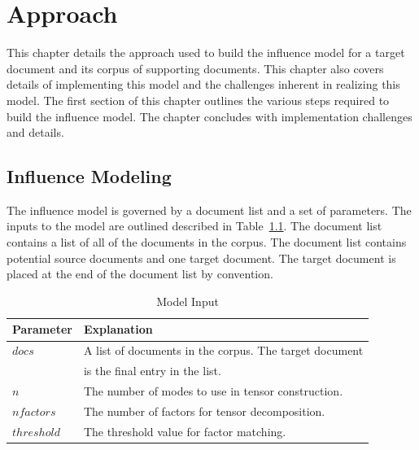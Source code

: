 \documentclass[../ut-dissertation.tex]{subfiles}
\begin{document}


\chapter{Approach}
This chapter details the approach used to build the influence model
for a target document and its corpus of supporting documents.  This
chapter also covers details of implementing this model and the
challenges inherent in realizing this model.  The first section of
this chapter outlines the various steps required to build the
influence model.  The chapter concludes with implementation challenges
and details.


\section{Influence Modeling}
The influence model is governed by a document list and a set of
parameters.  The inputs to the model are outlined described in
Table~\ref{table:modelInput}.  The document list contains a list of all
of the documents in the corpus.  The document list contains potential
source documents and one target document.  The target document is
placed at the end of the document list by convention.
\begin{table}[p]
  \centering
  \caption{Model Input}
  \label{table:modelInput}
  \begin{tabular}{ll}
    \hline
    Parameter & Explanation\\
    \hline
    $docs$ & A list of documents in the corpus.  The target document\\
           & is the final entry in the list. \\
    $n$ & The number of modes to use in tensor construction. \\
    $nfactors$ & The number of factors for tensor decomposition.\\
    $threshold$ & The threshold value for factor matching.\\
    \hline
  \end{tabular}\\
\end{table}
\end{document}
